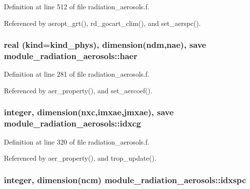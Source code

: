 Definition at line 512 of file radiation\+\_\+aerosols.\+f.



Referenced by aeropt\+\_\+grt(), rd\+\_\+gocart\+\_\+clim(), and set\+\_\+aerspc().

\subsubsection[{\texorpdfstring{haer}{haer}}]{\setlength{\rightskip}{0pt plus 5cm}real (kind=kind\+\_\+phys), dimension(ndm,nae), save module\+\_\+radiation\+\_\+aerosols\+::haer\hspace{0.3cm}{\ttfamily [private]}}\hypertarget{group__module__radiation__aerosols_ga8ce24a58afb33dd372995bf5aaf95be9}{}\label{group__module__radiation__aerosols_ga8ce24a58afb33dd372995bf5aaf95be9}


Definition at line 281 of file radiation\+\_\+aerosols.\+f.



Referenced by aer\+\_\+property(), and set\+\_\+aercoef().

\subsubsection[{\texorpdfstring{idxcg}{idxcg}}]{\setlength{\rightskip}{0pt plus 5cm}integer, dimension(nxc,imxae,jmxae), save module\+\_\+radiation\+\_\+aerosols\+::idxcg\hspace{0.3cm}{\ttfamily [private]}}\hypertarget{group__module__radiation__aerosols_ga4cb38abaf6ece5a0ed717edd6f6b4078}{}\label{group__module__radiation__aerosols_ga4cb38abaf6ece5a0ed717edd6f6b4078}


Definition at line 320 of file radiation\+\_\+aerosols.\+f.



Referenced by aer\+\_\+property(), and trop\+\_\+update().

\subsubsection[{\texorpdfstring{idxspc}{idxspc}}]{\setlength{\rightskip}{0pt plus 5cm}integer, dimension(ncm) module\+\_\+radiation\+\_\+aerosols\+::idxspc\hspace{0.3cm}{\ttfamily [private]}}\hypertarget{group__module__radiation__aerosols_ga8ca79ca1e5161374aff3cad4121b360f}{}\label{group__module__radiation__aerosols_ga8ca79ca1e5161374aff3cad4121b360f}


